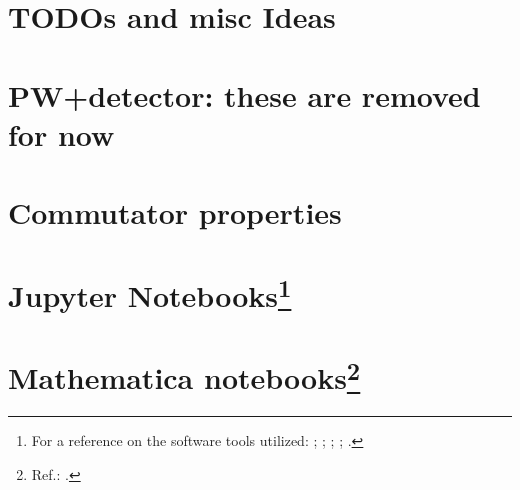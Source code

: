 \iftodo
  \chapter{TODOs and misc Ideas}
  
  \chapter{PW+detector: these are removed for now}
  
\fi

\appendix

\chapter{Commutator properties}


\chapter[Jupyter Notebooks]{Jupyter Notebooks\footnote{
  For a reference on the software tools utilized:
  \cite{comp:scipy};
  \cite{comp:sympy};
  \cite{comp:jupyter};
  \cite{comp:matplotlib};
  \cite{comp:numpy}.
}}



%


\chapter[Mathematica notebooks]{Mathematica notebooks\footnote{
  Ref.: \cite{Wolfram}.
}}



\printbibliography[heading=bibintoc]


